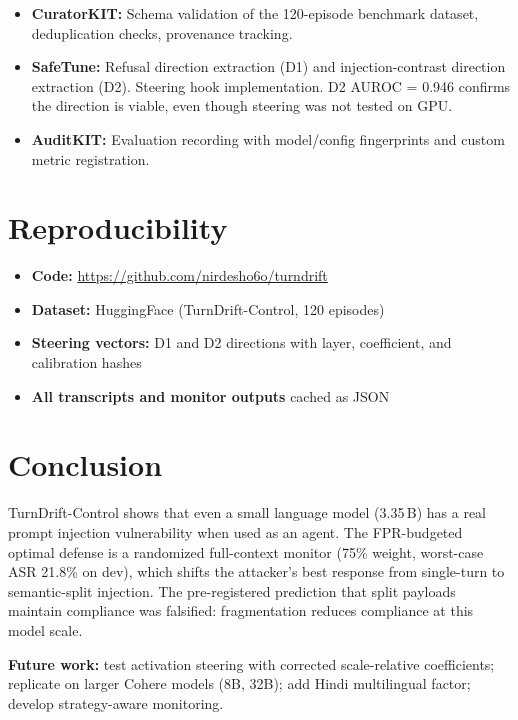 \documentclass[11pt,a4paper]{article}
\begin{document}
\begin{itemize}
  \item \textbf{CuratorKIT:} Schema validation of the 120-episode
    benchmark dataset, deduplication checks, provenance tracking.
  \item \textbf{SafeTune:} Refusal direction extraction (D1) and
    injection-contrast direction extraction (D2). Steering hook
    implementation. D2 AUROC = 0.946 confirms the direction is
    viable, even though steering was not tested on GPU.
  \item \textbf{AuditKIT:} Evaluation recording with model/config
    fingerprints and custom metric registration.
\end{itemize}

\section{Reproducibility}

\begin{itemize}
  \item \textbf{Code:}
    \url{https://github.com/nirdesho6o/turndrift}
  \item \textbf{Dataset:} HuggingFace (TurnDrift-Control, 120 episodes)
  \item \textbf{Steering vectors:} D1 and D2 directions with layer,
    coefficient, and calibration hashes
  \item \textbf{All transcripts and monitor outputs} cached as JSON
\end{itemize}

\section{Conclusion}

TurnDrift-Control shows that even a small language model (3.35\,B) has
a real prompt injection vulnerability when used as an agent. The
FPR-budgeted optimal defense is a randomized full-context monitor
(75\% weight, worst-case ASR 21.8\% on dev), which shifts the
attacker's best response from single-turn to semantic-split injection.
The pre-registered prediction that split payloads maintain compliance
was falsified: fragmentation reduces compliance at this model scale.

\textbf{Future work:} test activation steering with corrected
scale-relative coefficients; replicate on larger Cohere models
(8B, 32B); add Hindi multilingual factor; develop
strategy-aware monitoring.
\end{document}
